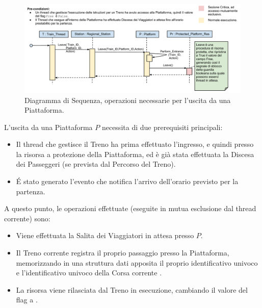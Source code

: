 \begin{description}
		\begin{figure}[htbp]
			\includegraphics[trim = 45mm 0mm 0mm 0mm,scale=0.55]{imgs/platform_exit_Sequence_Diagram.pdf}
			\caption{\footnotesize{Diagramma di Sequenza, operazioni necessarie per l'uscita da una Piattaforma.}}
			\label{fig:platform_access}
		\end{figure}
		
		L'uscita da una Piattaforma $P$ necessita di due prerequisiti principali:
		
			\begin{itemize}
				\item Il thread che gestisce il Treno ha prima effettuato l'ingresso, e quindi  presso la risorsa a protezione della Piattaforma, ed è già stata effettuata la Discesa dei Passeggeri (se prevista dal Percorso del Treno).
				\item \'E stato generato l'evento che notifica l'arrivo dell'orario previsto per la partenza.
			\end{itemize}
		
		A questo punto, le operazioni effettuate (eseguite in mutua esclusione dal thread corrente) sono:
		
			\begin{itemize}
				\item Viene effettuata la Salita dei Viaggiatori in attesa presso $P$.
				\item Il Treno corrente registra il proprio passaggio presso la Piattaforma, memorizzando in una struttura dati apposita  il proprio identificativo univoco e l'identificativo univoco della Corsa corrente .
				\item La risorsa viene rilasciata dal Treno in esecuzione, cambiando il valore del flag  a .
			\end{itemize}
		

\end{description}
